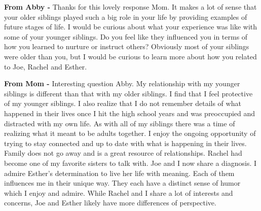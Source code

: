 \textbf{From Abby -} Thanks for this lovely response Mom.
It makes a lot of sense that your older siblings played such a big role in your life by providing examples of future stages of life.
I would be curious about what your experience was like with some of your younger siblings.
Do you feel like they influenced you in terms of how you learned to nurture or instruct others? Obviously most of your siblings were older than you, but I would be curious to learn more about how you related to Joe, Rachel and Esther.

\textbf{From Mom -} Interesting question Abby.
My relationship with my younger siblings is different than that with my older siblings.
I find that I feel protective of my younger siblings.
I also realize that I do not remember details of what happened in their lives once I hit the high school years and was preoccupied and distracted with my own life.
As with all of my siblings there was a time of realizing what it meant to be adults together.
I enjoy the ongoing opportunity of trying to stay connected and up to date with what is happening in their lives.
Family does not go away and is a great resource of relationships.
Rachel had become one of my favorite sisters to talk with.
Joe and I now share a diagnosis.
I admire Esther's determination to live her life with meaning.
Each of them influences me in their unique way.
They each have a distinct sense of humor which I enjoy and admire.
While Rachel and I share a lot of interests and concerns, Joe and Esther likely have more differences of perspective.
